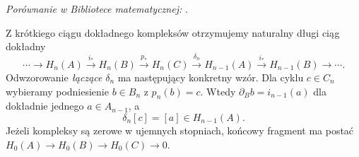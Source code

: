 \noindent\emph{Porównanie w Bibliotece matematycznej:} .

\begin{twierdzenie}
\label{thm:les-homologia}
Z krótkiego ciągu dokładnego kompleksów
otrzymujemy naturalny długi ciąg dokładny
\begin{equation}\label{eq:les-homologia}
 \cdots\longrightarrow H_n(A)
 \xrightarrow{i_*}H_n(B)
 \xrightarrow{p_*}H_n(C)
 \xrightarrow{\delta_n}H_{n-1}(A)
 \xrightarrow{i_*}H_{n-1}(B)
 \longrightarrow\cdots.
\end{equation}
Odwzorowanie \emph{łączące} $\delta_n$ ma następujący
konkretny wzór. Dla cyklu $c\in C_n$ wybieramy
podniesienie $b\in B_n$ z $p_n(b)=c$.
Wtedy $\partial_B b=i_{n-1}(a)$ dla dokładnie
jednego $a\in A_{n-1}$, a
\begin{equation}\label{eq:delta-wzor}
 \delta_n[c]=[a]\in H_{n-1}(A).
\end{equation}
Jeżeli kompleksy są zerowe w ujemnych stopniach,
końcowy fragment ma postać
$H_0(A)\to H_0(B)\to H_0(C)\to0$.
\end{twierdzenie}
